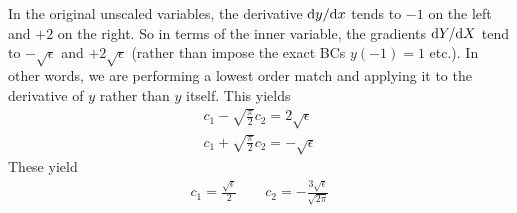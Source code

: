 In the original unscaled variables, the derivative $\mathrm{d} y/\mathrm{d} x$ tends to $-1$ on the left and $+2$ on the right. So in terms of the inner variable, the gradients $\mathrm{d} Y/\mathrm{d} X$ tend to $-\sqrt{\epsilon}$ and $+2 \sqrt{\epsilon}$ (rather than impose the exact BCs $y(-1)=1$ etc.). In other words, we are performing a lowest order match and applying it to the derivative of $y$ rather than $y$ itself. This yields
\begin{gather*}
	c_1 - \sqrt{\frac{\pi}{2}} c_2 = 2 \sqrt{\epsilon} \\
	c_1 + \sqrt{\frac{\pi}{2}} c_2 = -\sqrt{\epsilon}
\end{gather*}
These yield
\begin{gather*}
	c_1 = \frac{\sqrt{\epsilon}}{2} \qquad c_2 = - \frac{3\sqrt{\epsilon}}{\sqrt{2 \pi}}
\end{gather*}
